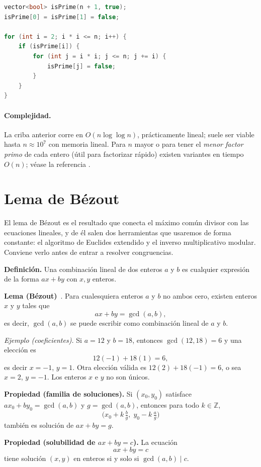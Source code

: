 \begin{lstlisting}[language=C++]
vector<bool> isPrime(n + 1, true);
isPrime[0] = isPrime[1] = false;

for (int i = 2; i * i <= n; i++) {
    if (isPrime[i]) {
        for (int j = i * i; j <= n; j += i) {
            isPrime[j] = false;
        }
    }
}
\end{lstlisting}
 
\paragraph{Complejidad.} La criba anterior corre en $O(n \log \log n)$, prácticamente lineal; suele ser viable hasta $n \approx 10^7$ con memoria lineal. Para $n$ mayor o para tener el \emph{menor factor primo} de cada entero (útil para factorizar rápido) existen variantes en tiempo $O(n)$; véase la referencia \cite{cpalg-sieve}.

\section{Lema de Bézout}

El lema de Bézout es el resultado que conecta el máximo común divisor con las ecuaciones lineales, y de él salen dos herramientas que usaremos de forma constante: el algoritmo de Euclides extendido y el inverso multiplicativo modular. Conviene verlo antes de entrar a resolver congruencias.

\textbf{Definición.} Una combinación lineal de dos enteros $a$ y $b$ es cualquier expresión de la forma $ax+by$ con $x,y$ enteros.

\textbf{Lema (Bézout)}~\cite{perez_numeros}. Para cualesquiera enteros $a$ y $b$ no ambos cero, existen enteros $x$ y $y$ tales que
\[
ax + by = \gcd(a, b),
\]
es decir, $\gcd(a,b)$ se puede escribir como combinación lineal de $a$ y $b$.

\textit{Ejemplo (coeficientes).} Si $a = 12$ y $b = 18$, entonces $\gcd(12,18) = 6$ y una elección es
\[
12(-1) + 18(1) = 6,
\]
es decir $x = -1$, $y = 1$. Otra elección válida es $12(2) + 18(-1) = 6$, o sea $x = 2$, $y = -1$. Los enteros $x$ e $y$ no son únicos.

\textbf{Propiedad (familia de soluciones).} Si $(x_0,y_0)$ satisface $ax_0 + by_0 = \gcd(a,b)$ y $g = \gcd(a,b)$, entonces para todo $k \in \mathbb{Z}$,
\[
\bigl(x_0 + k\,\tfrac{b}{g},\; y_0 - k\,\tfrac{a}{g}\bigr)
\]
también es solución de $ax + by = g$.

\textbf{Propiedad (solubilidad de $ax+by=c$).} La ecuación
\[
ax + by = c
\]
tiene solución $(x,y)$ en enteros si y solo si $\gcd(a,b) \mid c$.

